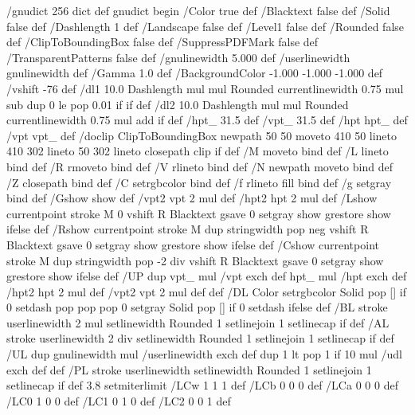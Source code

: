 /gnudict 256 dict def
gnudict begin
%
%
/Color true def
/Blacktext false def
/Solid false def
/Dashlength 1 def
/Landscape false def
/Level1 false def
/Rounded false def
/ClipToBoundingBox false def
/SuppressPDFMark false def
/TransparentPatterns false def
/gnulinewidth 5.000 def
/userlinewidth gnulinewidth def
/Gamma 1.0 def
/BackgroundColor {-1.000 -1.000 -1.000} def
%
/vshift -76 def
/dl1 {
  10.0 Dashlength mul mul
  Rounded { currentlinewidth 0.75 mul sub dup 0 le { pop 0.01 } if } if
} def
/dl2 {
  10.0 Dashlength mul mul
  Rounded { currentlinewidth 0.75 mul add } if
} def
/hpt_ 31.5 def
/vpt_ 31.5 def
/hpt hpt_ def
/vpt vpt_ def
/doclip {
  ClipToBoundingBox {
    newpath 50 50 moveto 410 50 lineto 410 302 lineto 50 302 lineto closepath
    clip
  } if
} def
%
%
%
/M {moveto} bind def
/L {lineto} bind def
/R {rmoveto} bind def
/V {rlineto} bind def
/N {newpath moveto} bind def
/Z {closepath} bind def
/C {setrgbcolor} bind def
/f {rlineto fill} bind def
/g {setgray} bind def
/Gshow {show} def   %
/vpt2 vpt 2 mul def
/hpt2 hpt 2 mul def
/Lshow {currentpoint stroke M 0 vshift R 
	Blacktext {gsave 0 setgray show grestore} {show} ifelse} def
/Rshow {currentpoint stroke M dup stringwidth pop neg vshift R
	Blacktext {gsave 0 setgray show grestore} {show} ifelse} def
/Cshow {currentpoint stroke M dup stringwidth pop -2 div vshift R 
	Blacktext {gsave 0 setgray show grestore} {show} ifelse} def
/UP {dup vpt_ mul /vpt exch def hpt_ mul /hpt exch def
  /hpt2 hpt 2 mul def /vpt2 vpt 2 mul def} def
/DL {Color {setrgbcolor Solid {pop []} if 0 setdash}
 {pop pop pop 0 setgray Solid {pop []} if 0 setdash} ifelse} def
/BL {stroke userlinewidth 2 mul setlinewidth
	Rounded {1 setlinejoin 1 setlinecap} if} def
/AL {stroke userlinewidth 2 div setlinewidth
	Rounded {1 setlinejoin 1 setlinecap} if} def
/UL {dup gnulinewidth mul /userlinewidth exch def
	dup 1 lt {pop 1} if 10 mul /udl exch def} def
/PL {stroke userlinewidth setlinewidth
	Rounded {1 setlinejoin 1 setlinecap} if} def
3.8 setmiterlimit
/LCw {1 1 1} def
/LCb {0 0 0} def
/LCa {0 0 0} def
/LC0 {1 0 0} def
/LC1 {0 1 0} def
/LC2 {0 0 1} def
